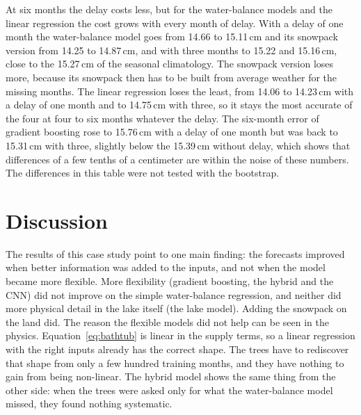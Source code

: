 \documentclass{article}
\begin{document}
At six months the delay costs less, but for the water-balance models and the linear regression the
cost grows with every month of delay. With a delay of
one month the water-balance model goes from 14.66 to 15.11\,cm and its snowpack version from
14.25 to 14.87\,cm, and with three months to 15.22 and 15.16\,cm, close to the 15.27\,cm of the
seasonal climatology. The snowpack version loses more, because its snowpack then has to be built
from average weather for the missing months. The linear regression loses the least, from 14.06
to 14.23\,cm with a delay of one month and to 14.75\,cm with three, so it stays the most accurate
of the four at four to six months whatever the delay. The six-month error of gradient boosting
rose to 15.76\,cm with a delay of one month but was back to 15.31\,cm with three, slightly below
the 15.39\,cm without delay, which shows that differences of a few tenths of a centimeter are
within the noise of these numbers. The differences in this table were not tested with the
bootstrap.

\section{Discussion}
\label{sec:discussion}

The results of this case study point to one main finding: the forecasts improved when better
information was added to the inputs, and not when the model became more flexible. More flexibility (gradient boosting, the
hybrid and the CNN) did not improve on the simple water-balance regression, and neither did more
physical detail in the lake itself (the lake model). Adding the snowpack on the land did. The
reason the flexible models did not help can be seen in the physics. Equation~\ref{eq:bathtub} is linear in the supply terms, so a linear regression with
the right inputs already has the correct shape. The trees have to rediscover that shape from only
a few hundred training months, and they have nothing to gain from being non-linear. The hybrid
model shows the same thing from the other side: when the trees were asked only for what the
water-balance model missed, they found nothing systematic.
\end{document}

